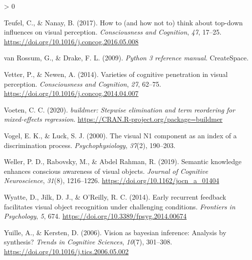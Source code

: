 \documentclass[
  english,
  doc,12pt,twoside,floatsintext]{apa7}
\newlength{\cslhangindent}
\newenvironment{CSLReferences}[2] %
 {%
  \setlength{\parindent}{0pt}
  \ifodd #1 \everypar{\setlength{\hangindent}{\cslhangindent}}\ignorespaces\fi
  \ifnum #2 > 0
  \setlength{\parskip}{#2\baselineskip}
  \fi
 }%
 {}
\begin{document}
\begin{CSLReferences}{1}{0}
\leavevmode\hypertarget{ref-teufel2017}{}%
Teufel, C., \& Nanay, B. (2017). How to (and how not to) think about top-down influences on visual perception. \emph{Consciousness and Cognition}, \emph{47}, 17--25. \url{https://doi.org/10.1016/j.concog.2016.05.008}

\leavevmode\hypertarget{ref-vanrossum2009}{}%
van Rossum, G., \& Drake, F. L. (2009). \emph{Python 3 reference manual}. CreateSpace.

\leavevmode\hypertarget{ref-vetter2014}{}%
Vetter, P., \& Newen, A. (2014). Varieties of cognitive penetration in visual perception. \emph{Consciousness and Cognition}, \emph{27}, 62--75. \url{https://doi.org/10.1016/j.concog.2014.04.007}

\leavevmode\hypertarget{ref-R-buildmer}{}%
Voeten, C. C. (2020). \emph{{buildmer}: Stepwise elimination and term reordering for mixed-effects regression}. \url{https://CRAN.R-project.org/package=buildmer}

\leavevmode\hypertarget{ref-vogel2000}{}%
Vogel, E. K., \& Luck, S. J. (2000). The visual {N1} component as an index of a discrimination process. \emph{Psychophysiology}, \emph{37}(2), 190--203.

\leavevmode\hypertarget{ref-weller2019}{}%
Weller, P. D., Rabovsky, M., \& Abdel Rahman, R. (2019). Semantic knowledge enhances conscious awareness of visual objects. \emph{Journal of Cognitive Neuroscience}, \emph{31}(8), 1216--1226. \url{https://doi.org/10.1162/jocn_a_01404}

\leavevmode\hypertarget{ref-wyatte2014}{}%
Wyatte, D., Jilk, D. J., \& O'Reilly, R. C. (2014). Early recurrent feedback facilitates visual object recognition under challenging conditions. \emph{Frontiers in Psychology}, \emph{5}, 674. \url{https://doi.org/10.3389/fpsyg.2014.00674}

\leavevmode\hypertarget{ref-yuille2006}{}%
Yuille, A., \& Kersten, D. (2006). Vision as bayesian inference: Analysis by synthesis? \emph{Trends in Cognitive Sciences}, \emph{10}(7), 301--308. \url{https://doi.org/10.1016/j.tics.2006.05.002}

\end{CSLReferences}
\end{document}
